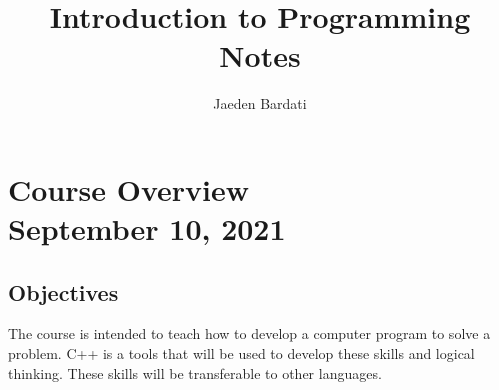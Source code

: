 \documentclass[]{article}
\title{Introduction to Programming Notes}
\author{Jaeden Bardati}
\begin{document}
\maketitle
\bigbreak

\section{Course Overview\\ {\large \normalfont September 10, 2021}}

\bigbreak

\subsection{Objectives}

\bigbreak

The course is intended to teach how to develop a computer program to solve a problem. C++ is a tools that will be used to develop these skills and logical thinking. These skills will be transferable to other languages.
\end{document}
